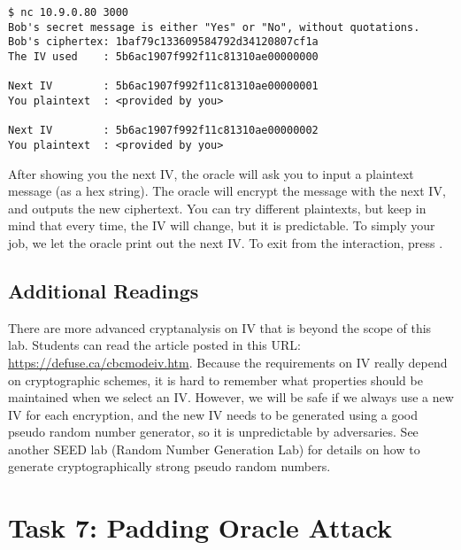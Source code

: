 \begin{lstlisting}
$ nc 10.9.0.80 3000
Bob's secret message is either "Yes" or "No", without quotations.
Bob's ciphertex: 1baf79c133609584792d34120807cf1a
The IV used    : 5b6ac1907f992f11c81310ae00000000

Next IV        : 5b6ac1907f992f11c81310ae00000001
You plaintext  : <provided by you>

Next IV        : 5b6ac1907f992f11c81310ae00000002
You plaintext  : <provided by you>
\end{lstlisting}

After showing you the next IV, 
the oracle will ask you to input a plaintext message (as a hex string).
The oracle will encrypt the message with the next IV, 
and outputs the new ciphertext.
You can try different plaintexts, but keep in mind that every time, the 
IV will change, but it is predictable. To simply your job, we let the 
oracle print out the next IV. To exit from the interaction, press .





\subsection{Additional Readings}

There are more advanced cryptanalysis on IV that is beyond the scope of this lab. Students
can read the article posted in this URL: \url{https://defuse.ca/cbcmodeiv.htm}.
Because the requirements on IV really depend on cryptographic schemes, it is hard to
remember what properties should be maintained when we select an IV.
However, we will be safe if we always use a new IV for each encryption, and the
new IV needs to be generated using a good pseudo random number
generator, so it is unpredictable by adversaries.
See another SEED lab (Random Number Generation Lab) for
details on how to generate cryptographically strong pseudo random numbers.

\section{Task 7: Padding Oracle Attack}


